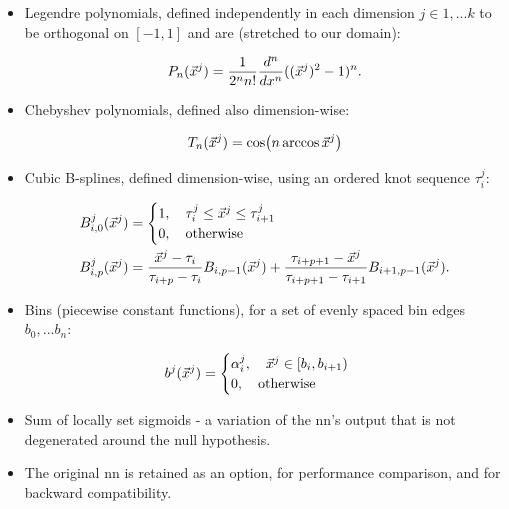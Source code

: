 \documentclass[thesis/Elad_Kliger_Thesis.tex]{subfiles}
\begin{document}
\begin{itemize}
    \item Legendre polynomials, defined independently in each dimension $j \in {1, ... k}$ to be orthogonal on $[-1,1]$ and are (stretched to our domain):

    \begin{equation}
        P_n(\vec{{x}}^j) = \frac{1}{2^n n!}\frac{d^n}{dx^n}((\vec{{x}}^j)^2-1)^n.
    \end{equation}
    
    \item Chebyshev polynomials, defined also dimension-wise:

    \begin{equation}
        T_n(\vec{{x}}^j) = \cos(n\arccos \vec{{x}}^j)
    \end{equation}
    
    \item Cubic B-splines, defined dimension-wise, using an ordered knot sequence $\tau_i^j$:

    \begin{equation}
    \begin{aligned}
        B_{i,0}^j(\vec{{x}}^j) &= \begin{cases}
            1, \quad \tau_i^j \leq \vec{{x}}^j \leq \tau_{i+1}^j \\
            0, \quad \text{otherwise}
        \end{cases} \\
        B_{i,p}^j(\vec{{x}}^j) &=
            \frac{\vec{{x}}^j-\tau_i}{\tau_{i+p}-\tau_i} B_{i,p-1}(\vec{{x}}^j)
            + \frac{\tau_{i+p+1}-\vec{{x}}^j}{\tau_{i+p+1}-\tau_{i+1}} B_{i+1,p-1}(\vec{{x}}^j).
    \end{aligned}
    \end{equation}

    \item Bins (piecewise constant functions), for a set of evenly spaced bin edges $b_0, ... b_n$:

    \begin{equation}
        b^j(\vec{{x}}^j) = \begin{cases}
            \alpha_i^j, \quad \vec{{x}}^j \in \left[b_i, b_{i+1}\right) \\
            0, \quad \text{otherwise}
        \end{cases}
    \end{equation}
    
    \item Sum of locally set sigmoids - a variation of the \gls{nn}'s output that is not degenerated around the null hypothesis.
    \item The original \gls{nn} is retained as an option, for performance comparison, and for backward compatibility.
\end{itemize}
\end{document}
